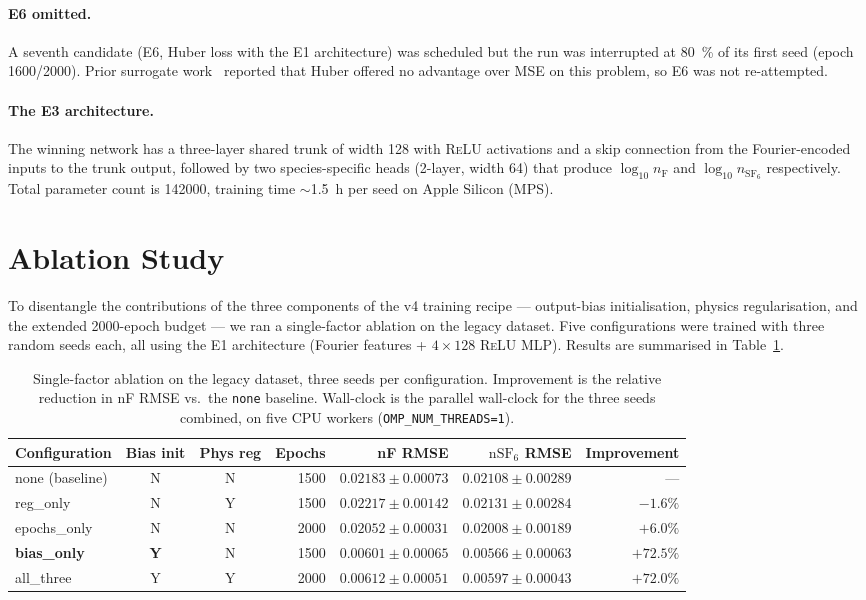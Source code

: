 \paragraph{E6 omitted.}
A seventh candidate (E6, Huber loss with the E1 architecture) was scheduled
but the run was interrupted at \SI{80}{\percent} of its first seed (epoch
1600/2000). Prior surrogate work~\cite{surrogate_v4_pdf} reported that Huber
offered no advantage over MSE on this problem, so E6 was not re-attempted.

\paragraph{The E3 architecture.}
The winning network has a three-layer shared trunk of width 128 with
\textsc{ReLU} activations and a skip connection from the Fourier-encoded
inputs to the trunk output, followed by two species-specific heads
(2-layer, width 64) that produce $\log_{10} n_\mathrm{F}$ and
$\log_{10} n_{\mathrm{SF}_6}$ respectively. Total parameter count is
\num{142000}, training time $\sim$\SI{1.5}{\hour} per seed on Apple Silicon
(MPS).

\section{Ablation Study}
\label{sec:ml-ablation}

To disentangle the contributions of the three components of the v4 training
recipe — output-bias initialisation, physics regularisation, and the extended
\num{2000}-epoch budget — we ran a single-factor ablation on the legacy
dataset. Five configurations were trained with three random seeds each, all
using the E1 architecture (Fourier features + $4 \times 128$ \textsc{ReLU}
MLP). Results are summarised in Table~\ref{tab:ml-ablation}.

\begin{table}[h]
\centering
\caption{Single-factor ablation on the legacy dataset, three seeds per
configuration. Improvement is the relative reduction in nF RMSE vs.\ the
\texttt{none} baseline. Wall-clock is the parallel wall-clock for the three
seeds combined, on five CPU workers (\texttt{OMP\_NUM\_THREADS=1}).}
\label{tab:ml-ablation}
\small
\begin{tabular}{l c c r r r r}
\toprule
Configuration & Bias init & Phys reg & Epochs & nF RMSE & $\mathrm{nSF}_6$ RMSE & Improvement \\
\midrule
none (baseline) & N & N & 1500 & $0.02183 \pm 0.00073$ & $0.02108 \pm 0.00289$ & --- \\
reg\_only       & N & Y & 1500 & $0.02217 \pm 0.00142$ & $0.02131 \pm 0.00284$ & $-1.6\%$ \\
epochs\_only    & N & N & 2000 & $0.02052 \pm 0.00031$ & $0.02008 \pm 0.00189$ & $+6.0\%$ \\
\textbf{bias\_only} & \textbf{Y} & N & 1500 & $\mathbf{0.00601 \pm 0.00065}$ & $\mathbf{0.00566 \pm 0.00063}$ & $\mathbf{+72.5\%}$ \\
all\_three      & Y & Y & 2000 & $0.00612 \pm 0.00051$ & $0.00597 \pm 0.00043$ & $+72.0\%$ \\
\bottomrule
\end{tabular}
\end{table}

